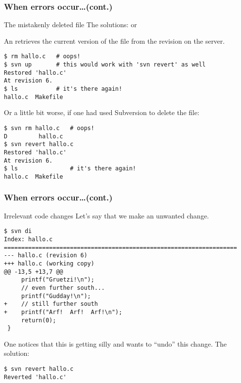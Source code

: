 \begin{frame}[fragile]
    \frametitle{When errors occur\ldots (cont.)}
    \linuxframe
    \vspace*{-3mm}
    \begin{alertblock}{The mistakenly deleted file}
        The solutions:  or 

        An  retrieves the current version of the file from
        the  revision on the server.
\begin{lstlisting}[basicstyle=\tiny\ttfamily\color{black}]
$ rm hallo.c   # oops!
$ svn up       # this would work with 'svn revert' as well
Restored 'hallo.c'
At revision 6.
$ ls           # it's there again!
hallo.c  Makefile
\end{lstlisting}

    Or a little bit worse, if one had used Subversion to delete the file:
\begin{lstlisting}[basicstyle=\tiny\ttfamily\color{black}]
$ svn rm hallo.c   # oops!
D         hallo.c
$ svn revert hallo.c
Restored 'hallo.c'
At revision 6.
$ ls               # it's there again!
hallo.c  Makefile
\end{lstlisting}
    \end{alertblock}

\end{frame}

\begin{frame}[fragile]
    \frametitle{When errors occur\ldots (cont.)}
    \linuxframe
    \vspace*{-3mm}
    \begin{alertblock}{Irrelevant code changes}
        Let's say that we make an unwanted change.
\begin{lstlisting}[basicstyle=\tiny\ttfamily\color{black}]
$ svn di
Index: hallo.c
===================================================================
--- hallo.c (revision 6)
+++ hallo.c (working copy)
@@ -13,5 +13,7 @@
     printf("Gruetzi!\n");
     // even further south...
     printf("Gudday!\n");
+    // still further south
+    printf("Arf!  Arf!  Arf!\n");
     return(0);
 }
\end{lstlisting}
    One notices that this is getting silly and wants to \enquote{undo} this
    change.
    The solution: 
\begin{lstlisting}[basicstyle=\tiny\ttfamily\color{black}]
$ svn revert hallo.c
Reverted 'hallo.c'
\end{lstlisting}

\end{alertblock}
\end{frame}

